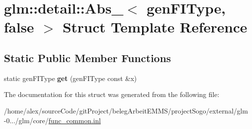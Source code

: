 \hypertarget{structglm_1_1detail_1_1Abs___3_01genFIType_00_01false_01_4}{\section{glm\-:\-:detail\-:\-:Abs\-\_\-$<$ gen\-F\-I\-Type, false $>$ Struct Template Reference}
\label{structglm_1_1detail_1_1Abs___3_01genFIType_00_01false_01_4}
}
\subsection*{Static Public Member Functions}
\begin{DoxyCompactItemize}
\item 
\hypertarget{structglm_1_1detail_1_1Abs___3_01genFIType_00_01false_01_4_a14974cbcc524a914d5a4d5a7cdd4557b}{static gen\-F\-I\-Type {\bfseries get} (gen\-F\-I\-Type const \&x)}\label{structglm_1_1detail_1_1Abs___3_01genFIType_00_01false_01_4_a14974cbcc524a914d5a4d5a7cdd4557b}

\end{DoxyCompactItemize}


The documentation for this struct was generated from the following file\-:\begin{DoxyCompactItemize}
\item 
/home/alex/source\-Code/git\-Project/beleg\-Arbeit\-E\-M\-M\-S/project\-Sogo/external/glm-\/0.../glm/core/\hyperlink{func__common_8inl}{func\-\_\-common.\-inl}\end{DoxyCompactItemize}
